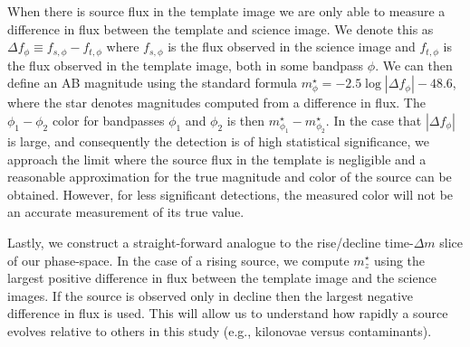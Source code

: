 When there is source flux in the template image we are only able to measure a difference in flux between the template and science image. We denote this as $\Delta f_{\phi} \equiv f_{s,\phi} - f_{t,\phi}$ where $f_{s,\phi}$ is the flux observed in the science image and $f_{t,\phi}$ is the flux observed in the template image, both in some bandpass $\phi$. We can then define an AB magnitude using the standard formula $m^{\star}_{\phi} = -2.5\log{|\Delta f_{\phi}|}-48.6$, where the star denotes magnitudes computed from a difference in flux. The $\phi_1 - \phi_2$ color for bandpasses $\phi_1$ and $\phi_2$ is then $m^{\star}_{\phi_1} - m^{\star}_{\phi_2}$. In the case that $|\Delta f_{\phi}|$ is large, and consequently the detection is of high statistical significance,  we approach the limit where the source flux in the template is negligible and a reasonable approximation for the true magnitude and color of the source can be obtained. However, for less significant detections, the measured color will not be an accurate measurement of its true value.

Lastly, we construct a straight-forward analogue to the rise/decline time-$\Delta m$ slice of our phase-space. In the case of a rising source, we compute $m^{\star}_z$ using the largest positive difference in flux between the template image and the science images. If the source is observed only in decline then the largest negative difference in flux is used. This will allow us to understand how rapidly a source evolves relative to others in this study (e.g., kilonovae versus contaminants).

